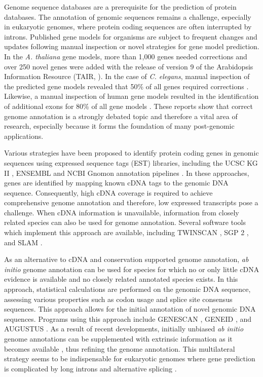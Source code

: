Genome sequence databases are a prerequisite for the prediction of protein 
databases.
The annotation of genomic sequences remains a challenge, especially in
eukaryotic genomes, where protein coding sequences are often interrupted by
introns.
Published gene models for organisms are subject to frequent changes and updates
following manual inspection or novel strategies for gene model prediction.
In the {\em A. thaliana} gene models, more than 1,000 genes needed corrections
and over 250 novel genes were added with the release of version 9 of the
Arabidopsis Information Resource (TAIR, \cite{Huala2001}).
In the case of {\em C. elegans}, manual inspection of the predicted gene models
revealed that 50\% of all genes required corrections \citep{Reboul2003}.
Likewise, a manual inspection of human gene models resulted in the 
identification of additional exons for 80\% of all gene models 
\citep{Pennisi2007}.
These reports show that correct genome annotation is a strongly debated
topic and therefore a vital area of research, especially because it forms
the foundation of many post-genomic applications.

Various strategies have been proposed to identify protein coding genes in
genomic sequences using expressed sequence tags (EST) libraries, 
including the UCSC KG II \citep{Karolchik2003}, ENSEMBL \citep{Hubbard2005} 
and NCBI Gnomon annotation pipelines \citep{Maglott2005}.
In these approaches, genes are identified by mapping known cDNA tags to the
genomic DNA sequence.
Consequently, high cDNA coverage is required to achieve comprehensive
genome annotation and therefore, low expressed transcripts pose a challenge.
When cDNA information is unavailable, information from closely related
species can also be used for genome annotation.
Several software tools which implement this approach are available,
including TWINSCAN \citep{Korf2001}, SGP 2 \citep{Parra2003}, and 
SLAM \citep{Cawley2003}.

As an alternative to cDNA and conservation supported genome annotation,
{\em ab initio} genome annotation can be used for species for which no
or only little cDNA evidence is available and no closely related annotated
species exists.
In this approach, statistical calculations are performed on the genomic
DNA sequence, assessing various properties such as codon usage and splice 
site consensus sequences.
This approach allows for the initial annotation of novel genomic DNA 
sequences.
Programs using this approach include GENESCAN \citep{Burge1997}, 
GENEID \citep{Parra2000}, and AUGUSTUS \citep{Stanke2004, Stanke2006}.
As a result of recent developments, initially unbiased {\em ab initio} 
genome annotations can be supplemented with extrinsic information as it 
becomes available \citep{Stanke2008}, thus refining the genome annotation.
This multilateral strategy seems to be indispensable for eukaryotic genomes
where gene prediction is complicated by long introns and alternative splicing
\citep{Brent2004}.

